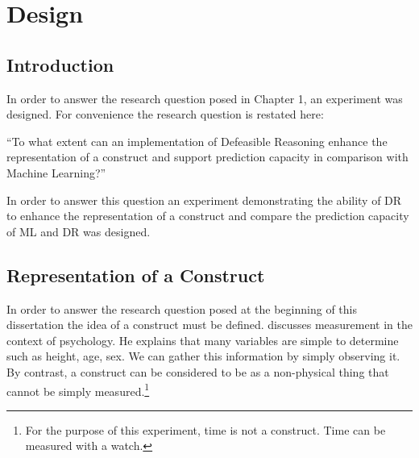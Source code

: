 
\chapter{Design} %

\label{Chapter3} %



\section{Introduction}

In order to answer the research question posed in Chapter 1, an experiment was designed. For convenience the research question is restated here:

``To what extent can an implementation of Defeasible Reasoning enhance the representation of a construct and support prediction capacity in comparison with Machine Learning?''

In order to answer this question an experiment demonstrating the ability of DR to enhance the representation of a construct and compare the prediction capacity of ML and DR was designed.



\section{Representation of a Construct}
In order to answer the research question posed at the beginning of this dissertation the idea of a construct must be defined.
\cite{price2013research} discusses measurement in the context of psychology. He explains that many variables are simple to determine such as height, age, sex. We can gather this information by simply observing it. By contrast, a construct can be considered to be as a non-physical thing that cannot be simply measured.\footnote{For the purpose of this experiment, time is not a construct. Time can be measured with a watch.} 

